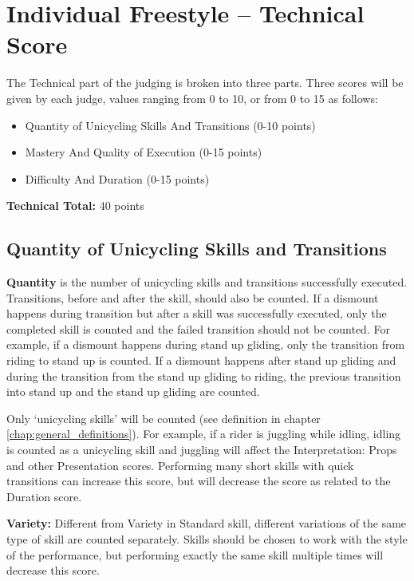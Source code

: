 \section{Individual Freestyle -- Technical Score \label{sec:freestyle_individual-technical-score}}
The Technical part of the judging is broken into three parts.
Three scores will be given by each judge, values ranging from 0 to 10, or from 0 to 15 as follows: 
\begin{itemize}
\item Quantity of Unicycling Skills And Transitions (0-10 points) 
\item Mastery And Quality of Execution (0-15 points) 
\item Difficulty And Duration (0-15 points) 
\end{itemize}
\textbf{Technical Total:} 40 points

\subsection{Quantity of Unicycling Skills and Transitions}
\textbf{Quantity} is the number of unicycling skills and transitions successfully executed.
Transitions, before and after the skill, should also be counted.
If a dismount happens during transition but after a skill was successfully executed, only the completed skill is counted and the failed transition should not be counted.
For example, if a dismount happens during stand up gliding, only the transition from riding to stand up is counted.
If a dismount happens after stand up gliding and during the transition from the stand up gliding to riding, the previous transition into stand up and the stand up gliding are counted.

Only `unicycling skills' will be counted (see definition in chapter \ref{chap:general_definitions}).
For example, if a rider is juggling while idling, idling is counted as a unicycling skill and juggling will affect the Interpretation: Props and other Presentation scores.
Performing many short skills with quick transitions can increase this score, but will decrease the score as related to the Duration score.

\textbf{Variety:} Different from Variety in Standard skill, different variations of the same type of skill are counted separately.
Skills should be chosen to work with the style of the performance, but performing exactly the same skill multiple times will decrease this score.

